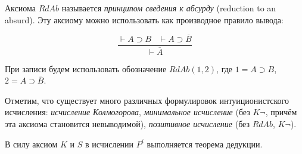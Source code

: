 \begin{remark}
    Аксиома $RdAb$ называется \textit{принципом сведения к абсурду} (reduction to an absurd). Эту аксиому можно использовать как производное правило вывода:

    \begin{equation*}
        \frac{
            \vdash A \supset B \;\;\; \vdash A \supset \overline{B}
        }{
            \vdash \overline{A}
        }
    \end{equation*}

    При записи будем использовать обозначение $RdAb(1, 2)$, где $1 = A \supset B$, $2 = A \supset \overline{B}$.
\end{remark}

\begin{remark}
    Отметим, что существует много различных формулировок интуиционистского исчисления: \textit{исчисление Колмогорова}, \textit{минимальное исчисление} (без $K\lnot$, причём эта аксиома становится невыводимой), \textit{позитивное исчисление} (без $RdAb$, $K\lnot$).
\end{remark}

\begin{remark}
    В силу аксиом $K$ и $S$ в исчислении $P^i$ выполняется теорема дедукции.
\end{remark}